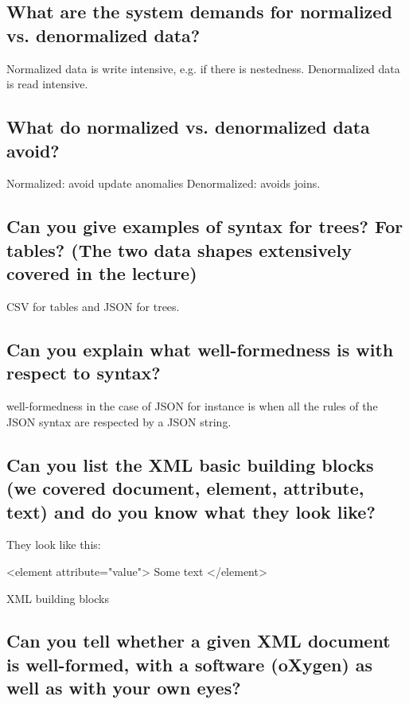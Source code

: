 \documentclass{article}
\begin{document}
\subsection{What are the system demands for normalized vs. denormalized data?}

Normalized data is write intensive, e.g. if there is nestedness. Denormalized data is read intensive.

\subsection{What do normalized vs. denormalized data avoid?}

Normalized: avoid update anomalies
Denormalized: avoids joins.

\subsection{Can you give examples of syntax for trees? For tables? (The two data shapes extensively covered in the lecture)}

CSV for tables and JSON for trees.


\subsection{Can you explain what well-formedness is with respect to syntax?}

well-formedness in the case of JSON for instance is when all the rules of the JSON syntax are respected by a JSON string.

\subsection{Can you list the XML basic building blocks (we covered document, element, attribute, text) and do you know what they look like?}

They look like this:
\begin{center}
\begin{listing}[!ht]
  \begin{xml}
    <element attribute="value">
    Some text
    </element>
  \end{xml}
  \caption[Test]{XML building blocks}
  \label{lst:test}
\end{listing}
\end{center}


\subsection{Can you tell whether a given XML document is well-formed, with a software (oXygen) as well as with your own eyes?}
\end{document}

